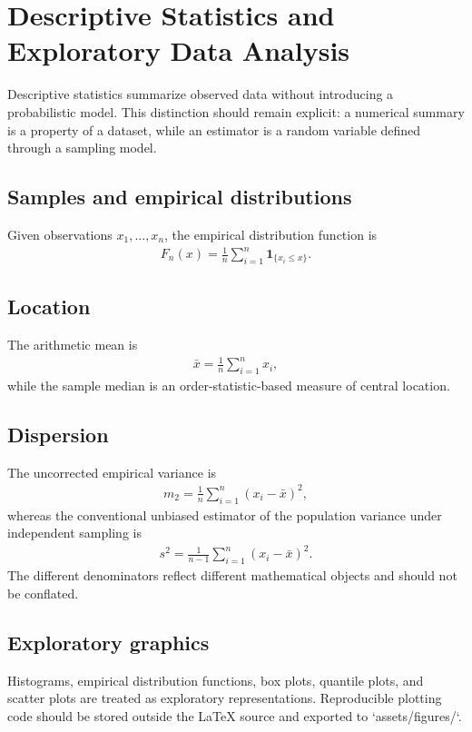 \chapter{Descriptive Statistics and Exploratory Data Analysis}
\label{chap:descriptive-statistics}

Descriptive statistics summarize observed data without introducing a probabilistic model. This distinction should remain explicit: a numerical summary is a property of a dataset, while an estimator is a random variable defined through a sampling model.

\section{Samples and empirical distributions}

Given observations $x_1,\ldots,x_n$, the empirical distribution function is
\begin{align}
F_n(x)=\frac{1}{n}\sum_{i=1}^{n}\mathbf{1}_{\{x_i\leq x\}}.
\end{align}

\section{Location}

The arithmetic mean is
\begin{align}
\bar{x}=\frac{1}{n}\sum_{i=1}^{n}x_i,
\end{align}
while the sample median is an order-statistic-based measure of central location.

\section{Dispersion}

The uncorrected empirical variance is
\begin{align}
m_2=\frac{1}{n}\sum_{i=1}^{n}(x_i-\bar{x})^2,
\end{align}
whereas the conventional unbiased estimator of the population variance under independent sampling is
\begin{align}
s^2=\frac{1}{n-1}\sum_{i=1}^{n}(x_i-\bar{x})^2.
\end{align}
The different denominators reflect different mathematical objects and should not be conflated.

\section{Exploratory graphics}

Histograms, empirical distribution functions, box plots, quantile plots, and scatter plots are treated as exploratory representations. Reproducible plotting code should be stored outside the LaTeX source and exported to `assets/figures/`.
